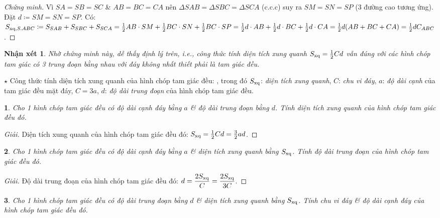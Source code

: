 \documentclass{article}
\newtheorem{baitoan}{}
\newtheorem{nhanxet}{Nhận xét}
\begin{document}
\begin{proof}[Chứng minh]
	Vì $SA = SB = SC$ \& $AB = BC = CA$ nên $\Delta SAB = \Delta SBC = \Delta SCA$ (c.c.c) suy ra $SM = SN = SP$ (3 đường cao tương ứng). Đặt $d\coloneqq SM = SN = SP$. Có: $S_{{\rm xq},S.ABC}\coloneqq S_{SAB} + S_{SBC} + S_{SCA} = \frac{1}{2}AB\cdot SM + \frac{1}{2}BC\cdot SN + \frac{1}{2}BC\cdot SP = \frac{1}{2}d\cdot AB + \frac{1}{2}d\cdot BC + \frac{1}{2}d\cdot CA = \frac{1}{2}d(AB + BC + CA) = \frac{1}{2}dC_{ABC}$.
\end{proof}

\begin{nhanxet}
	Nhờ chứng minh này, dễ thấy định lý trên, i.e., công thức tính diện tích xung quanh $S_{\rm xq} = \frac{1}{2}Cd$ vẫn đúng với các hình chóp tam giác có 3 trung đoạn bằng nhau với đáy không nhất thiết phải là tam giác đều.
\end{nhanxet}
\noindent$\star$ {\sf Công thức tính diện tích xung quanh của hình chóp tam giác đều:} , trong đó $S_{\rm xq}$: \textit{diện tích xung quanh}, $C$: \textit{chu vi đáy}, $a$: \textit{độ dài cạnh} của tam giác đều mặt đáy, $C = 3a$, $d$: \textit{độ dài trung đoạn} của hình chóp tam giác đều.

\begin{baitoan}
	Cho 1 hình chóp tam giác đều có độ dài cạnh đáy bằng $a$ \& độ dài trung đoạn bằng $d$. Tính diện tích xung quanh của hình chóp tam giác đều đó.
\end{baitoan}

\begin{proof}[Giải]
	Diện tích xung quanh của hình chóp tam giác đều đó: $S_{\rm xq} = \frac{1}{2}Cd = \frac{3}{2}ad$.
\end{proof}

\begin{baitoan}
	Cho 1 hình chóp tam giác đều có độ dài cạnh đáy bằng $a$ \& diện tích xung quanh bằng $S_{\rm xq}$. Tính độ dài trung đoạn của hình chóp tam giác đều đó.
\end{baitoan}

\begin{proof}[Giải]
	Độ dài trung đoạn của hình chóp tam giác đều đó: $d = \dfrac{2S_{\rm xq}}{C} = \dfrac{2S_{\rm xq}}{3C}$.
\end{proof}

\begin{baitoan}
	Cho 1 hình chóp tam giác đều có độ dài trung đoạn bằng $d$ \& diện tích xung quanh bằng $S_{\rm xq}$. Tính chu vi đáy \& độ dài cạnh đáy của hình chóp tam giác đều đó.
\end{baitoan}
\end{document}
